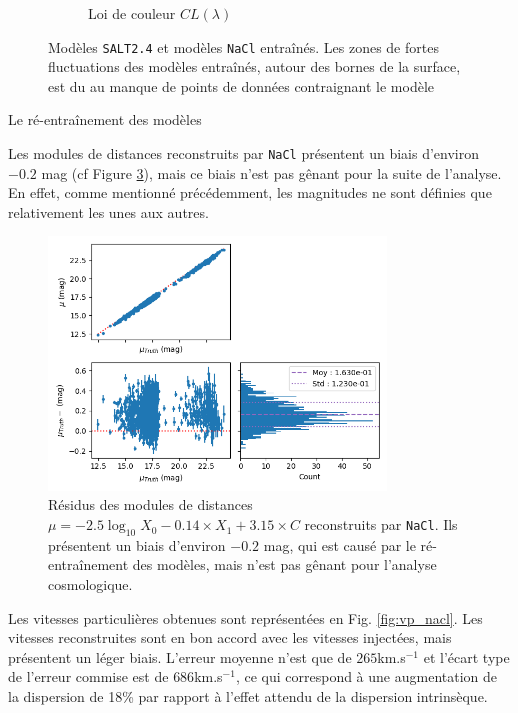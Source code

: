 \documentclass{book}
\def\nacl{\texttt{NaCl}\xspace}
\def\saltd{\texttt{SALT2.4}\xspace}
\begin{document}
\begin{figure}
\begin{subfigure}{0.9\textwidth}
		\caption{Loi de couleur $CL(\lambda)$}
		\label{fig:nacl_cl}
	\end{subfigure}
	\caption{Modèles \saltd et modèles \nacl entraînés. Les zones de fortes fluctuations des modèles entraînés, autour des bornes de la surface, est du au manque de points de données contraignant le modèle}
	\label{fig:nacl_models}
\end{figure}

Le ré-entraînement des modèles 

\begin{figure}

\end{figure}

Les modules de distances reconstruits par \nacl présentent un biais d'environ $-0.2$ mag (cf Figure \ref{fig:nacl_mu}), mais ce biais n'est pas gênant pour la suite de l'analyse. En effet, comme mentionné précédemment, les magnitudes ne sont définies que relativement les unes aux autres.

\begin{figure}
    \centering
    \includegraphics[width=0.8\textwidth]{figures/nacl_mu.png}
    \caption{Résidus des modules de distances $\mu = -2.5\log_{10} X_0 - 0.14 \times X_1 + 3.15 \times  C$ reconstruits par \nacl. Ils présentent un biais d'environ $-0.2$ mag, qui est causé par le ré-entraînement des modèles, mais n'est pas gênant pour l'analyse cosmologique.}
    \label{fig:nacl_mu}
\end{figure}

Les vitesses particulières obtenues sont représentées en Fig. \ref{fig:vp_nacl}. Les vitesses reconstruites sont en bon accord avec les vitesses injectées, mais présentent un léger biais. L'erreur moyenne n'est que de $265$km.s$^{-1}$ et l'écart type de l'erreur commise est de $686$km.s$^{-1}$, ce qui correspond à une augmentation de la dispersion de 18\% par rapport à l'effet attendu de la dispersion intrinsèque.
\end{document}
